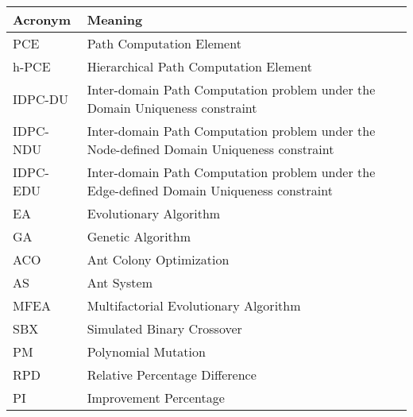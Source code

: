 \fontsize{13}{16}
\selectfont
\begin{center}
	\begin{tabular}{|p{1in}|p{5in}|}
		\hline
		\textbf{Acronym} & \textbf{Meaning}  \\ \hline
		PCE & Path Computation Element	\\ \hline
		h-PCE & Hierarchical Path Computation Element	\\ \hline
		IDPC-DU & Inter-domain Path Computation problem under the Domain Uniqueness constraint \\ \hline
		IDPC-NDU & Inter-domain Path Computation problem under the Node-defined Domain Uniqueness constraint \\ \hline
		IDPC-EDU & Inter-domain Path Computation problem under the Edge-defined Domain Uniqueness constraint \\ \hline
		EA & Evolutionary Algorithm \\ \hline
		GA & Genetic Algorithm  \\ \hline
		ACO & Ant Colony Optimization \\ \hline
		AS & Ant System \\ \hline
		MFEA & Multifactorial Evolutionary Algorithm \\ \hline
		SBX & Simulated Binary Crossover\\ \hline
		PM & Polynomial Mutation\\ \hline
		RPD & Relative Percentage Difference\\ \hline
		PI & Improvement Percentage\\ \hline
	\end{tabular}    
\end{center}


\pagebreak